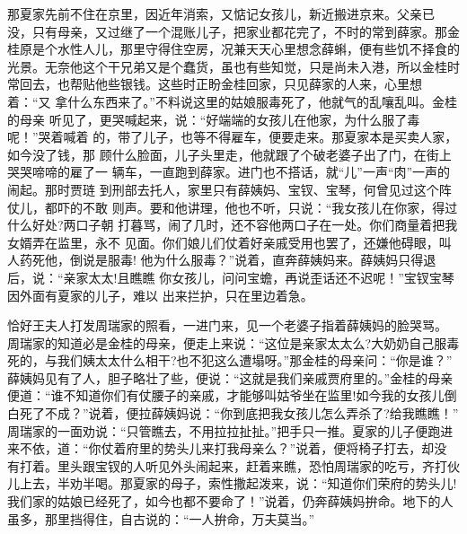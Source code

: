 那夏家先前不住在京里，因近年消索，又惦记女孩儿，新近搬进京来。父亲已
没，只有母亲，又过继了一个混账儿子，把家业都花完了，不时的常到薛家。那金
桂原是个水性人儿，那里守得住空房，况兼天天心里想念薛蝌，便有些饥不择食的
光景。无奈他这个干兄弟又是个蠢货，虽也有些知觉，只是尚未入港，所以金桂时
常回去，也帮贴他些银钱。这些时正盼金桂回家，只见薛家的人来，心里想着：“又
拿什么东西来了。”不料说这里的姑娘服毒死了，他就气的乱嚷乱叫。金桂的母亲
听见了，更哭喊起来，说：“好端端的女孩儿在他家，为什么服了毒呢！”哭着喊着
的，带了儿子，也等不得雇车，便要走来。那夏家本是买卖人家，如今没了钱，那
顾什么脸面，儿子头里走，他就跟了个破老婆子出了门，在街上哭哭啼啼的雇了一
辆车，一直跑到薛家。进门也不搭话，就“儿”一声“肉”一声的闹起。那时贾琏
到刑部去托人，家里只有薛姨妈、宝钗、宝琴，何曾见过这个阵仗儿，都吓的不敢
则声。要和他讲理，他也不听，只说：“我女孩儿在你家，得过什么好处?两口子朝
打暮骂，闹了几时，还不容他两口子在一处。你们商量着把我女婿弄在监里，永不
见面。你们娘儿们仗着好亲戚受用也罢了，还嫌他碍眼，叫人药死他，倒说是服毒!
他为什么服毒？”说着，直奔薛姨妈来。薛姨妈只得退后，说：“亲家太太!且瞧瞧
你女孩儿，问问宝蟾，再说歪话还不迟呢！”宝钗宝琴因外面有夏家的儿子，难以
出来拦护，只在里边着急。

恰好王夫人打发周瑞家的照看，一进门来，见一个老婆子指着薛姨妈的脸哭骂。
周瑞家的知道必是金桂的母亲，便走上来说：“这位是亲家太太么?大奶奶自己服毒
死的，与我们姨太太什么相干?也不犯这么遭塌呀。”那金桂的母亲问：“你是谁？”
薛姨妈见有了人，胆子略壮了些，便说：“这就是我们亲戚贾府里的。”金桂的母亲
便道：“谁不知道你们有仗腰子的亲戚，才能够叫姑爷坐在监里!如今我的女孩儿倒
白死了不成？”说着，便拉薛姨妈说：“你到底把我女孩儿怎么弄杀了?给我瞧瞧！”
周瑞家的一面劝说：“只管瞧去，不用拉拉扯扯。”把手只一推。夏家的儿子便跑进
来不依，道：“你仗着府里的势头儿来打我母亲么？”说着，便将椅子打去，却没
有打着。里头跟宝钗的人听见外头闹起来，赶着来瞧，恐怕周瑞家的吃亏，齐打伙
儿上去，半劝半喝。那夏家的母子，索性撒起泼来，说：“知道你们荣府的势头儿!
我们家的姑娘已经死了，如今也都不要命了！”说着，仍奔薛姨妈拚命。地下的人
虽多，那里挡得住，自古说的：“一人拚命，万夫莫当。”


